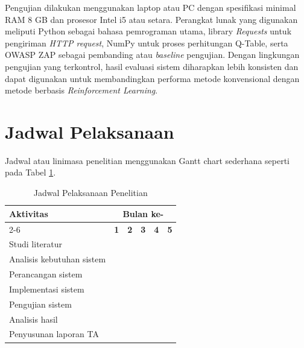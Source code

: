Pengujian dilakukan menggunakan laptop atau PC dengan spesifikasi minimal RAM 8 GB dan prosesor Intel i5 atau setara. Perangkat lunak yang digunakan meliputi Python sebagai bahasa pemrograman utama, library \textit{Requests} untuk pengiriman \textit{HTTP request}, NumPy untuk proses perhitungan Q-Table, serta OWASP ZAP sebagai pembanding atau \textit{baseline} pengujian. Dengan lingkungan pengujian yang terkontrol, hasil evaluasi sistem diharapkan lebih konsisten dan dapat digunakan untuk membandingkan performa metode konvensional dengan metode berbasis \textit{Reinforcement Learning}.


\section{Jadwal Pelaksanaan}

Jadwal atau linimasa penelitian menggunakan Gantt chart sederhana seperti pada Tabel \ref{tab:jadwal_pelaksanaan}.

\begin{table}[H]
\centering
\caption{Jadwal Pelaksanaan Penelitian}
\label{tab:jadwal_pelaksanaan}
\begin{tabular}{lccccc}
\hline
\textbf{Aktivitas} & \multicolumn{5}{c}{\textbf{Bulan ke-}} \\ 
\cline{2-6}
 & \textbf{1} & \textbf{2} & \textbf{3} & \textbf{4} & \textbf{5} \\ 
\hline

Studi literatur 
& \cellcolor{gray!60} & \cellcolor{gray!60} &  &  &  \\

Analisis kebutuhan sistem 
& \cellcolor{gray!60} &  &  &  &  \\

Perancangan sistem 
&  & \cellcolor{gray!60} & \cellcolor{gray!60} &  &  \\

Implementasi sistem 
&  &  & \cellcolor{gray!60} & \cellcolor{gray!60} &  \\

Pengujian sistem 
&  &  &  & \cellcolor{gray!60} & \cellcolor{gray!60} \\

Analisis hasil 
&  &  &  &  & \cellcolor{gray!60} \\

Penyusunan laporan TA 
& \cellcolor{gray!60} & \cellcolor{gray!60} & \cellcolor{gray!60} & \cellcolor{gray!60} & \cellcolor{gray!60} \\

\hline
\end{tabular}
\end{table}